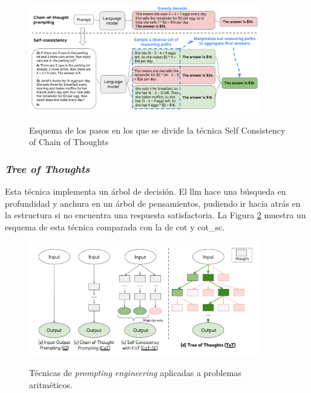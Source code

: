 \begin{figure}[H]
    \caption[]{Esquema de los pasos en los que se divide la técnica {Self Consistency of Chain of Thoughts}}
    \centering
    \includegraphics[width=0.9\textwidth]{./figuras/cot_sc.png}
    \label{fig:cot_sc}
\end{figure}

\subsubsection{\emph{Tree of Thoughts}}

Esta técnica implementa un árbol de decisión. El \gls{llm} hace una búsqueda en profundidad y anchura en un árbol de pensamientos, pudiendo ir hacia atrás en la estructura si no encuentra una respuesta satisfactoria. La Figura \ref{fig:prompting_engineering} muestra un esquema de esta técnica comparada con la de \gls{cot} y \gls{cot_sc}.

\begin{figure}[H]
  \caption[Técnicas de \emph{prompting engineering}]{Técnicas de \emph{prompting engineering} aplicadas a problemas aritméticos.}
  \centering
  \includegraphics[width=0.9\textwidth]{./figuras/prompt_engineering_techniques.png}
  \label{fig:prompting_engineering}
\end{figure}


